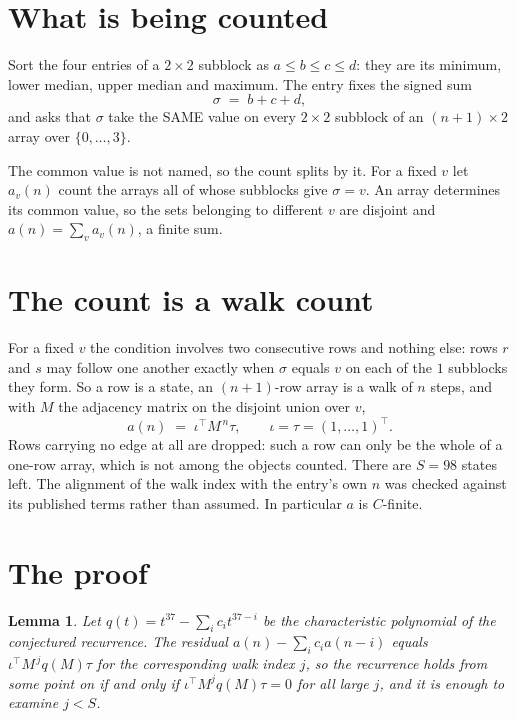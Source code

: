 \documentclass[11pt,a4paper]{article}
\theoremstyle{plain}
\newtheorem{lemma}[theorem]{Lemma}
\theoremstyle{definition}
\begin{document}
\section{What is being counted}

Sort the four entries of a $2\times2$ subblock as $a\le b\le c\le d$: they
are its minimum, lower median, upper median and maximum. The entry fixes the signed sum
\[
\sigma\;=\;b+c+d,
\]
and asks that $\sigma$ take the SAME value on every $2\times2$ subblock of an
$(n+1)\times2$ array over $\{0,\dots,3\}$.

The common value is not named, so the count splits by it. For a fixed $v$ let $a_v(n)$ count
the arrays all of whose subblocks give $\sigma=v$. An array determines its common value, so
the sets belonging to different $v$ are disjoint and $a(n)=\sum_v a_v(n)$, a finite sum.


\section{The count is a walk count}

For a fixed $v$ the condition involves two consecutive rows and nothing
else: rows $r$ and $s$ may follow one another exactly when $\sigma$ equals $v$ on each of the
$1$ subblocks they form. So a row is a state, an $(n+1)$-row array is a walk of $n$
steps, and with $M$ the adjacency matrix on the disjoint union over $v$,
\[
a(n)\;=\;\iota^{\!\top}M^{\,n}\tau,\qquad\iota=\tau=(1,\dots,1)^{\!\top} .
\]
Rows carrying no edge at all are dropped: such a row can only be the whole of a one-row
array, which is not among the objects counted. There are $S=98$ states left.
The alignment of the walk index with the entry's own $n$ was checked against its published
terms rather than assumed. In particular $a$ is $C$-finite.

\section{The proof}

\begin{lemma}\label{lem:crit}
Let $q(t)=t^{37}-\sum_i c_it^{37-i}$ be the characteristic polynomial of the
conjectured recurrence. The residual $a(n)-\sum_ic_ia(n-i)$ equals
$\iota^{\!\top}M^{\,j}q(M)\tau$ for the corresponding walk index $j$, so the recurrence
holds from some point on if and only if $\iota^{\!\top}M^{j}q(M)\tau=0$ for all large $j$,
and it is enough to examine $j<S$.
\end{lemma}
\end{document}
